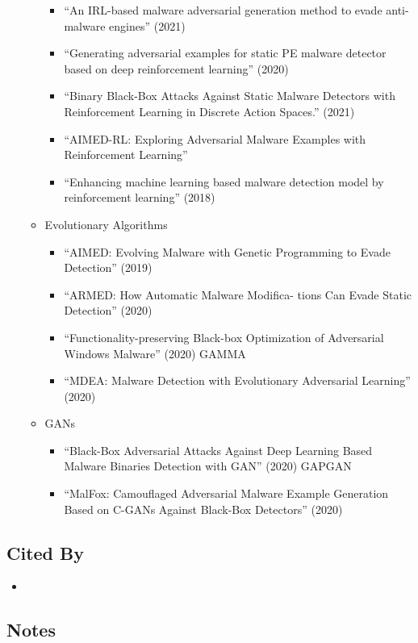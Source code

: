 \documentclass{article}
\begin{document}
\begin{itemize}
\begin{itemize}
\begin{itemize}
			\item ``An IRL-based malware adversarial generation method to evade anti-malware engines'' (2021)
			\item ``Generating adversarial examples for static PE malware detector based on deep reinforcement learning'' (2020)
			\item ``Binary Black-Box Attacks Against Static Malware Detectors with Reinforcement Learning in Discrete Action Spaces.'' (2021)
			\item ``AIMED-RL: Exploring Adversarial Malware Examples with Reinforcement Learning''
			\item ``Enhancing machine learning based malware detection model by reinforcement learning'' (2018)
		\end{itemize}
		\item Evolutionary Algorithms
		\begin{itemize}
			\item ``AIMED: Evolving Malware with Genetic Programming to Evade Detection'' (2019)
			\item ``ARMED: How Automatic Malware Modifica- tions Can Evade Static Detection'' (2020)
			\item ``Functionality-preserving Black-box Optimization of Adversarial Windows Malware'' (2020) GAMMA
			\item ``MDEA: Malware Detection with Evolutionary Adversarial Learning'' (2020)
		\end{itemize}
		\item GANs
		\begin{itemize}
			\item ``Black-Box Adversarial Attacks Against Deep Learning Based Malware Binaries Detection with GAN'' (2020) GAPGAN 
			\item ``MalFox: Camouflaged Adversarial Malware Example Generation Based on C-GANs Against Black-Box Detectors'' (2020)
		\end{itemize}
	\end{itemize}
\end{itemize}

\subsection*{Cited By}
\begin{itemize}
	\item
\end{itemize}

\subsection*{Notes}
\end{document}
